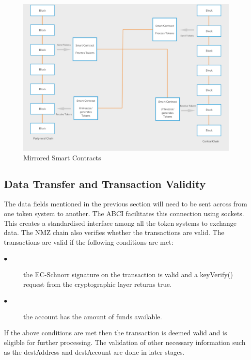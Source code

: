 \documentclass[a4paper,twoside,phd]{BYUPhys}
\begin{document}
\begin{figure} 
  \includegraphics[width=\linewidth]{mirrored_blockchains.png}
  \caption{Mirrored Smart Contracts}
  \label{fig:2}
\end{figure}

\subsection{Data Transfer and Transaction Validity}
The data fields mentioned in the previous section will need to be sent across from one token system to another. The ABCI facilitates this connection using sockets. This creates a standardised interface among all the token systems to exchange data. The NMZ chain also verifies whether the transactions are valid. The transactions are valid if the following conditions are met:
\begin{description}
\item[$\bullet$]the EC-Schnorr signature on the transaction is valid and a keyVerify() request from the cryptographic layer returns true.
\item[$\bullet$]the account has the amount of funds available.
\end{description}

If the above conditions are met then the transaction is deemed valid and is eligible for further processing. The validation of other necessary information such as the destAddress and destAccount are done in later stages. 
\end{document}
